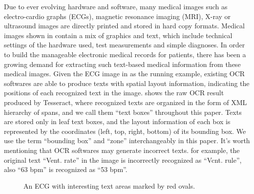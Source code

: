 Due to ever evolving hardware and software, many medical images
such as electro-cardio graphs (ECGs), magnetic resonance imaging (MRI),
X-ray or ultrasound images are directly printed and stored in hard copy formats.
Medical images shown in 
contain a mix of graphics and text,
which include technical settings of the hardware used,
test measurements and simple diagnoses.
In order to build the manageable electronic medical records for patients,
there has been a growing demand for extracting such text-based
medical information from these medical images.
Given the ECG image in  as the running example,
existing OCR softwares are able to produce texts with spatial layout information,
indicating the positions of each recognized text in the image.
 shows the raw OCR result produced by Tesseract,
where recognized texts are organized in the form of XML hierarchy of spans,
and we call them ``text boxes'' throughout this paper.
Texts are stored only in leaf text boxes,
and the layout information of each box is represented by
the coordinates (left, top, right, bottom) of its bounding box.
We use the term ``bounding box'' and ``zone'' interchangeably in this paper.
It's worth mentioning that OCR softwares may generate incorrect texts.
for example, the original text ``Vent. rate'' in the image
is incorrectly recognized as ``Vcnt. rule'',
also ``63 bpm'' is recognized as ``53 bpm''.

\begin{figure}[ht]
\centering
{}
\caption{An ECG with interesting text areas marked by red ovals.}
\label{fig:running-ecg}
\end{figure}





